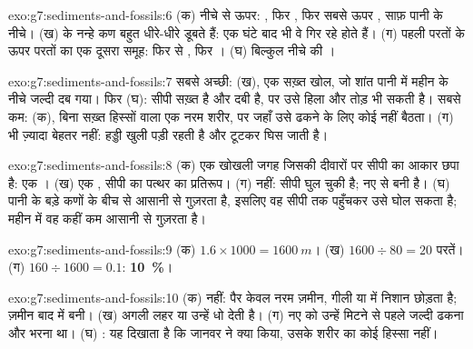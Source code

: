 \begin{solution}{exo:g7:sediments-and-fossils:6}
(क) नीचे से ऊपर: , फिर , फिर सबसे ऊपर , साफ़ पानी के नीचे। (ख) 
के नन्हे कण बहुत धीरे-धीरे डूबते हैं: एक घंटे बाद भी वे गिर रहे होते हैं। (ग) पहली
परतों के ऊपर परतों का एक दूसरा समूह: फिर से , फिर । (घ) बिल्कुल नीचे की
।
\end{solution}

\begin{solution}{exo:g7:sediments-and-fossils:7}
सबसे अच्छी: (ख), एक सख़्त खोल, जो शांत पानी में महीन  के नीचे जल्दी दब गया।
फिर (घ): सीपी सख़्त है और दबी है, पर  उसे हिला और तोड़ भी सकती है। सबसे कम:
(क), बिना सख़्त हिस्सों वाला एक नरम शरीर,  पर जहाँ उसे ढकने के लिए कोई
 नहीं बैठता। (ग) भी ज़्यादा बेहतर नहीं: हड्डी खुली पड़ी रहती है और टूटकर घिस
जाती है।
\end{solution}

\begin{solution}{exo:g7:sediments-and-fossils:8}
(क) एक खोखली जगह जिसकी दीवारों पर सीपी का आकार छपा है: एक । (ख) एक ,
सीपी का पत्थर का प्रतिरूप। (ग) नहीं: सीपी घुल चुकी है;  नए  से बनी है।
(घ) पानी  के बड़े कणों के बीच से आसानी से गुज़रता है, इसलिए वह सीपी तक पहुँचकर
उसे घोल सकता है; महीन  में वह कहीं कम आसानी से
गुज़रता है।
\end{solution}

\begin{solution}{exo:g7:sediments-and-fossils:9}
(क) $1.6 \times 1000 = \qty{1600}{m}$। (ख) $1600 \div 80 = 20$ परतें।
(ग) $160 \div 1600 = 0.1$: \textbf{10~\%}।
\end{solution}

\begin{solution}{exo:g7:sediments-and-fossils:10}
(क) नहीं: पैर केवल नरम ज़मीन, गीली  या  में निशान छोड़ता है; ज़मीन बाद में
 बनी। (ख) अगली लहर या  उन्हें धो देती है। (ग) नए  को उन्हें मिटने से
पहले जल्दी ढकना और भरना था। (घ) : यह दिखाता है कि जानवर ने क्या किया,
उसके शरीर का कोई हिस्सा नहीं।
\end{solution}

